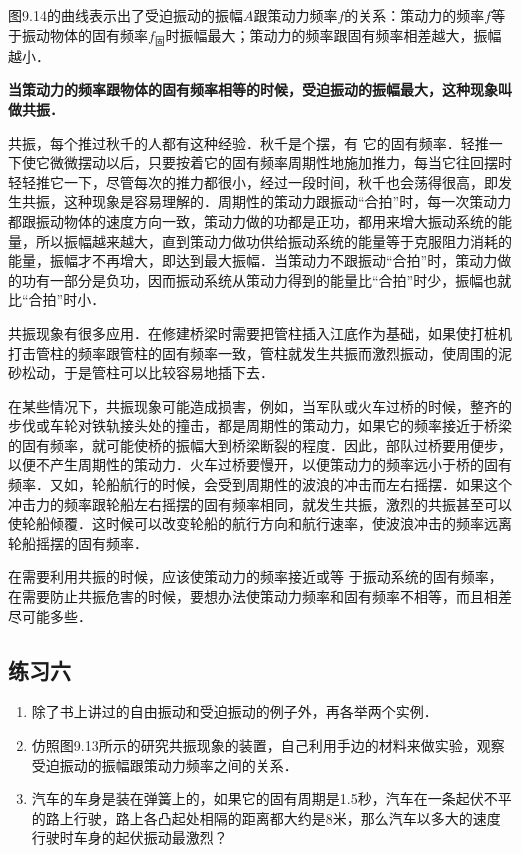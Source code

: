 图9.14的曲线表示出了受迫振动的振幅$A$跟策动力频率$f$的关系：策动力的频率$f$等于振动物体的固有频率$f_{\text{固}}$时振幅最大；策动力的频率跟固有频率相差越大，振幅越小．

\textbf{当策动力的频率跟物体的固有频率相等的时候，受迫振动的振幅最大，这种现象叫做共振．}

共振，每个推过秋千的人都有这种经验．秋千是个摆，有
它的固有频率．轻推一下使它微微摆动以后，只要按着它的固有频率周期性地施加推力，每当它往回摆时轻轻推它一下，尽管每次的推力都很小，经过一段时间，秋千也会荡得很高，即发生共振，这种现象是容易理解的．周期性的策动力跟振动“合拍”时，每一次策动力都跟振动物体的速度方向一致，策动力做的功都是正功，都用来增大振动系统的能量，所以振幅越来越大，直到策动力做功供给振动系统的能量等于克服阻力消耗的能量，振幅才不再增大，即达到最大振幅．当策动力不跟振动“合拍”时，策动力做的功有一部分是负功，因而振动系统从策动力得到的能量比“合拍”时少，振幅也就比“合拍”时小．

共振现象有很多应用．在修建桥梁时需要把管柱插入江底作为基础，如果使打桩机打击管柱的频率跟管柱的固有频率一致，管柱就发生共振而激烈振动，使周围的泥砂松动，于是管柱可以比较容易地插下去．

在某些情况下，共振现象可能造成损害，例如，当军队或火车过桥的时候，整齐的步伐或车轮对铁轨接头处的撞击，都是周期性的策动力，如果它的频率接近于桥梁的固有频率，就可能使桥的振幅大到桥梁断裂的程度．因此，部队过桥要用便步，以便不产生周期性的策动力．火车过桥要慢开，以便策动力的频率远小于桥的固有频率．又如，轮船航行的时候，会受到周期性的波浪的冲击而左右摇摆．如果这个冲击力的频率跟轮船左右摇摆的固有频率相同，就发生共振，激烈的共振甚至可以使轮船倾覆．这时候可以改变轮船的航行方向和航行速率，使波浪冲击的频率远离轮船摇摆的固有频率．

在需要利用共振的时候，应该使策动力的频率接近或等
于振动系统的固有频率，在需要防止共振危害的时候，要想办法使策动力频率和固有频率不相等，而且相差尽可能多些．

\subsection*{练习六}
\begin{enumerate}
    \item 除了书上讲过的自由振动和受迫振动的例子外，再各举两个实例．
    \item 仿照图9.13所示的研究共振现象的装置，自己利用手边的材料来做实验，观察受迫振动的振幅跟策动力频率之间的关系．
    \item 汽车的车身是装在弹簧上的，如果它的固有周期是1.5秒，汽车在一条起伏不平的路上行驶，路上各凸起处相隔的距离都大约是8米，那么汽车以多大的速度行驶时车身的起伏振动最激烈？
\end{enumerate}

